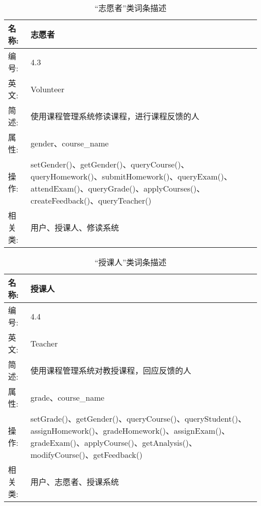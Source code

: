 \begin{table}[H]  
\caption{“志愿者”类词条描述}  
\begin{center}  
    \begin{tabular}{l p{11cm}} 
        \hline
        \quad 名称:  &  志愿者 \\
        \hline
        \quad 编号:  & 4.3 \\
        \hline
        \quad 英文:  &  Volunteer \\
        \hline
        \quad 简述:  & 使用课程管理系统修读课程，进行课程反馈的人 \\
        \hline
        \quad 属性:  & gender、course\_name \\
        \hline 
        \quad 操作:  & setGender()、getGender()、queryCourse()、queryHomework()、submitHomework()、queryExam()、attendExam()、queryGrade()、applyCourses()、createFeedback()、queryTeacher()\\
        \hline
        \quad 相关类:  & 用户、授课人、修读系统 \\
        \hline
    \end{tabular}
\end{center}
\end{table}

\begin{table}[H]  
\caption{“授课人”类词条描述}  
\begin{center}  
    \begin{tabular}{l p{11cm}} 
        \hline
        \quad 名称:  &  授课人 \\
        \hline
        \quad 编号:  & 4.4 \\
        \hline
        \quad 英文:  &  Teacher \\
        \hline
        \quad 简述:  & 使用课程管理系统对教授课程，回应反馈的人 \\
        \hline
        \quad 属性:  & grade、course\_name \\
        \hline
        \quad 操作:  & setGrade()、getGender()、queryCourse()、queryStudent()、assignHomework()、gradeHomework()、assignExam()、gradeExam()、applyCourse()、getAnalysis()、modifyCourse()、getFeedback() \\
        \hline
        \quad 相关类:  & 用户、志愿者、授课系统 \\
        \hline
    \end{tabular}
\end{center}
\end{table}

